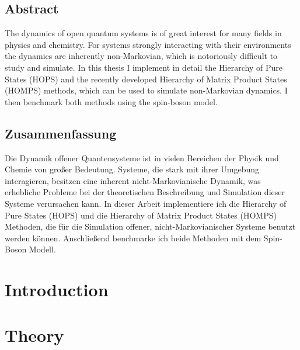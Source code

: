 \documentclass[%
thesis=student,%
coverpage=false,%
titlepage=false,%
headmarks=true, %
twoside=false,
english,%
font=libertine, %
math=newpxtx, %
BCOR=5mm,%
coverBCOR=11mm,%
]{tumbook}
\begin{document}
\begin{refsection}
\thispagestyle{empty}

\newpage

\thispagestyle{empty}

\section*{Abstract}
The dynamics of open quantum systems is of great interest for many fields in physics and chemistry. For systems strongly interacting
with their environments the dynamics are inherently non-Markovian, which is notoriously difficult to study and simulate.
In this thesis I implement in detail the Hierarchy of Pure States (HOPS) \cite{Suess:2014} and the recently developed Hierarchy of Matrix Product States (HOMPS) \cite{Gao:2022} methods,
which can be used to simulate non-Markovian dynamics. I then benchmark both methods using the spin-boson model.

\section*{Zusammenfassung}
Die Dynamik offener Quantensysteme ist in vielen Bereichen der Physik und Chemie von großer Bedeutung. Systeme, die stark mit ihrer Umgebung interagieren,
besitzen eine inherent nicht-Markovianische Dynamik, was erhebliche Probleme bei der theoretischen Beschreibung und Simulation dieser Systeme verursachen kann.
In dieser Arbeit implementiere ich die Hierarchy of Pure States (HOPS) \cite{Suess:2014} und die Hierarchy of Matrix Product States (HOMPS) \cite{Gao:2022}
Methoden, die für die Simulation offener, nicht-Markovianischer Systeme benutzt werden können. Anschließend benchmarke ich beide Methoden mit dem Spin-Boson Modell. 

\newpage

\tableofcontents
\thispagestyle{empty}

\mainmatter{}

\chapter{Introduction}
\label{chap:Introduction}


\chapter{Theory}
\label{chap:Theory}



\end{refsection}
\end{document}
